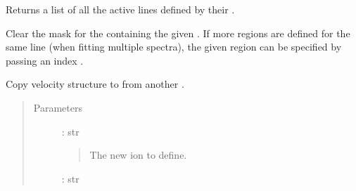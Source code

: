 \documentclass[letterpaper,10pt,english]{sphinxmanual}
\begin{document}
\begin{fulllineitems}
\begin{fulllineitems}
\begin{quote}
\begin{description}
\end{description}\end{quote}

\end{fulllineitems}


\begin{fulllineitems}
\label{\detokenize{api:VoigtFit.DataSet.all_active_lines}}
Returns a list of all the active lines defined by their .

\end{fulllineitems}


\begin{fulllineitems}
\label{\detokenize{api:VoigtFit.DataSet.clear_mask}}
Clear the mask for the {\hyperref[\detokenize{api:regions.Region}]{}}
containing the given .
If more regions are defined for the same line (when fitting multiple spectra),
the given region can be specified by passing an index .

\end{fulllineitems}


\begin{fulllineitems}
\label{\detokenize{api:VoigtFit.DataSet.copy_components}}
Copy velocity structure to  from another .
\begin{quote}\begin{description}
\item[{Parameters}] \leavevmode
{} : str
\begin{quote}

The new ion to define.
\end{quote}

 : str
\begin{quote}


\end{quote}
\end{description}
\end{quote}
\end{fulllineitems}
\end{fulllineitems}
\end{document}
